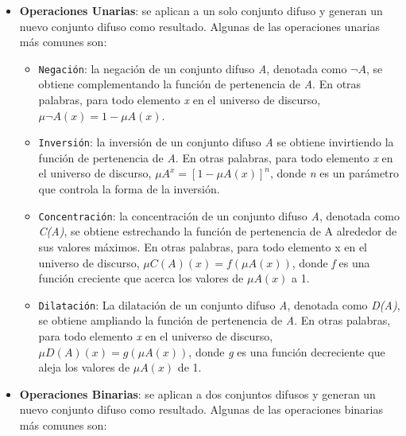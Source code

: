 \documentclass[
  a4paper,
  DIV=11,
  numbers=noendperiod]{scrreprt}
\begin{document}
\begin{itemize}
\item
  \textbf{Operaciones Unarias}: se aplican a un solo conjunto difuso y
  generan un nuevo conjunto difuso como resultado. Algunas de las
  operaciones unarias más comunes son:

  \begin{itemize}
  \item
    \texttt{Negación}: la negación de un conjunto difuso \emph{A},
    denotada como \(¬A\), se obtiene complementando la función de
    pertenencia de \emph{A}. En otras palabras, para todo elemento
    \emph{x} en el universo de discurso, \(\mu ¬A(x) = 1 - \mu A(x)\).
  \item
    \texttt{Inversión}: la inversión de un conjunto difuso \emph{A} se
    obtiene invirtiendo la función de pertenencia de \emph{A}. En otras
    palabras, para todo elemento \emph{x} en el universo de discurso,
    \(\mu A^{x} = [1 - \mu A(x)]^n\), donde \emph{n} es un parámetro que
    controla la forma de la inversión.
  \item
    \texttt{Concentración}: la concentración de un conjunto difuso
    \emph{A}, denotada como \emph{C(A)}, se obtiene estrechando la
    función de pertenencia de A alrededor de sus valores máximos. En
    otras palabras, para todo elemento x en el universo de discurso,
    \(\mu C(A)(x) = f(\mu A(x))\), donde \emph{f} es una función
    creciente que acerca los valores de \(\mu A(x)\) a 1.
  \item
    \texttt{Dilatación}: La dilatación de un conjunto difuso \emph{A},
    denotada como \emph{D(A)}, se obtiene ampliando la función de
    pertenencia de \emph{A}. En otras palabras, para todo elemento
    \emph{x} en el universo de discurso, \(\mu D(A)(x) = g(\mu A(x))\),
    donde \emph{g} es una función decreciente que aleja los valores de
    \(\mu A(x)\) de 1.
  \end{itemize}
\item
  \textbf{Operaciones Binarias}: se aplican a dos conjuntos difusos y
  generan un nuevo conjunto difuso como resultado. Algunas de las
  operaciones binarias más comunes son:


\end{itemize}
\end{document}
